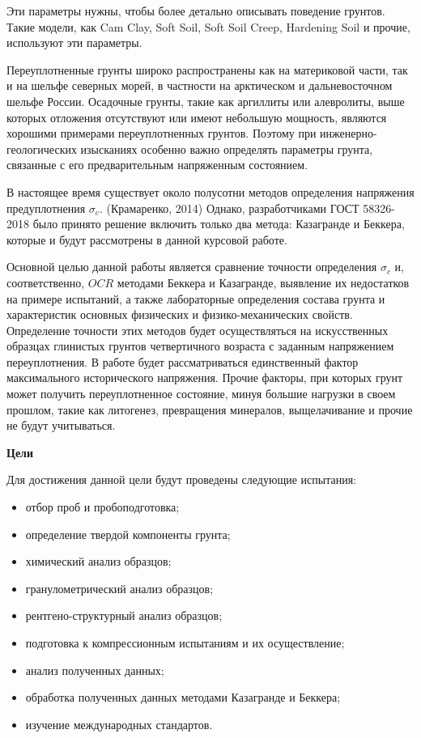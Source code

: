 Эти параметры нужны, чтобы более детально описывать поведение грунтов.%
Такие модели, как Cam Clay, Soft Soil, Soft Soil Creep, Hardening Soil и прочие, используют эти параметры. 

Переуплотненные грунты широко распространены как на материковой части, так и на шельфе северных морей, в частности на арктическом и дальневосточном шельфе России.
Осадочные грунты, такие как аргиллиты или алевролиты, выше которых отложения отсутствуют или имеют небольшую мощность, являются хорошими примерами переуплотненных грунтов.
Поэтому при инженерно-геологических изысканиях особенно важно определять параметры грунта, связанные с его предварительным напряженным состоянием.

В настоящее время существует около полусотни  методов определения напряжения предуплотнения $\sigma_c$. (Крамаренко, 2014) \cite{kram2014}
Однако, разработчиками ГОСТ 58326-2018 было принято решение включить только два метода: Казагранде и Беккера, которые и будут рассмотрены в данной курсовой работе. 

Основной целью данной работы является сравнение точности определения $\sigma_c$ и, соответственно, $OCR$ методами Беккера и Казагранде, выявление их недостатков на примере испытаний, а также лабораторные определения состава грунта и характеристик основных физических и физико-механических свойств. 
Определение точности этих методов будет осуществляться на искусственных образцах глинистых грунтов четвертичного возраста с заданным напряжением переуплотнения. 
В работе будет рассматриваться единственный фактор максимального исторического напряжения. Прочие факторы, при которых грунт может получить переуплотненное состояние, минуя большие нагрузки в своем прошлом, такие как литогенез, превращения минералов, выщелачивание и прочие не будут учитываться.

\textbf{Цели}

Для достижения данной цели будут проведены следующие испытания:
\begin{itemize}
    \item отбор проб и пробоподготовка; 
    \item определение твердой компоненты грунта;
    \item химический анализ образцов;
    \item гранулометрический анализ образцов;
    \item рентгено-структурный анализ образцов;
    \item подготовка к компрессионным испытаниям и их осуществление;
    \item анализ полученных данных;
    \item обработка полученных данных методами Казагранде и Беккера;
    \item изучение международных стандартов.
\end{itemize}

